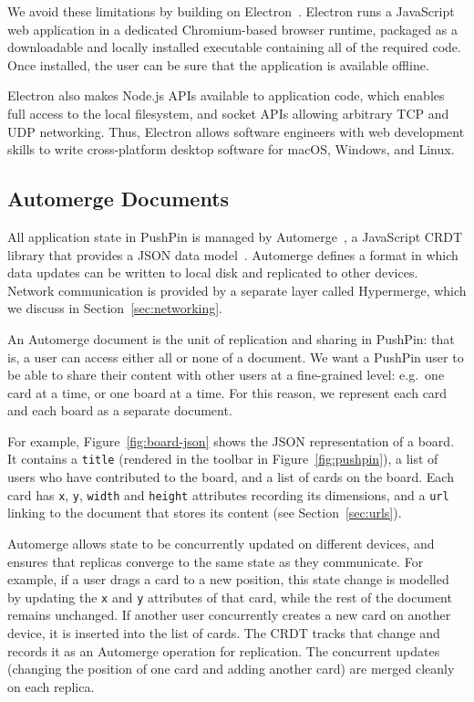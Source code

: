 \documentclass[sigplan,10pt]{acmart}
\begin{document}
We avoid these limitations by building on Electron~\cite{Electron}.
Electron runs a JavaScript web application in a dedicated Chromium-based browser runtime, packaged as a downloadable and locally installed executable containing all of the required code.
Once installed, the user can be sure that the application is available offline.

Electron also makes Node.js APIs available to application code, which enables full access to the local filesystem, and socket APIs allowing arbitrary TCP and UDP networking.
Thus, Electron allows software engineers with web development skills to write cross-platform desktop software for macOS, Windows, and Linux.

\subsection{Automerge Documents}\label{sec:documents}
All application state in PushPin is managed by Automerge~\cite{Automerge:2018,Automerge}, a JavaScript CRDT library that provides a JSON data model~\cite{Kleppmann:2017ca}.
Automerge defines a format in which data updates can be written to local disk and replicated to other devices.
Network communication is provided by a separate layer called Hypermerge, which we discuss in Section~\ref{sec:networking}.

An Automerge document is the unit of replication and sharing in PushPin: that is, a user can access either all or none of a document.
We want a PushPin user to be able to share their content with other users at a fine-grained level: e.g.\ one card at a time, or one board at a time.
For this reason, we represent each card and each board as a separate document.

For example, Figure~\ref{fig:board-json} shows the JSON representation of a board.
It contains a \texttt{title} (rendered in the toolbar in Figure~\ref{fig:pushpin}), a list of users who have contributed to the board, and a list of cards on the board.
Each card has \texttt{x}, \texttt{y}, \texttt{width} and \texttt{height}  attributes recording its dimensions, and a \texttt{url} linking to the document that stores its content (see Section~\ref{sec:urls}).

Automerge allows state to be concurrently updated on different devices, and ensures that replicas converge to the same state as they communicate.
For example, if a user drags a card to a new position, this state change is modelled by updating the \texttt{x} and \texttt{y} attributes of that card, while the rest of the document remains unchanged.
If another user concurrently creates a new card on another device, it is inserted into the list of cards.
The CRDT tracks that change and records it as an Automerge operation for replication.
The concurrent updates (changing the position of one card and adding another card) are merged cleanly on each replica.
\end{document}
